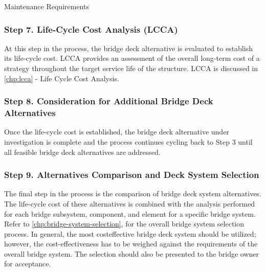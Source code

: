 \begin{table}
  \caption{Maintenance Requirements}
  \label{tab:maintenance-requirements}
\end{table}

\subsubsection*{Step 7. Life-Cycle Cost Analysis (LCCA)}
At this step in the process, the bridge deck alternative is evaluated to establish its life-cycle cost. LCCA provides an assessment of the overall long-term cost of a strategy throughout the target service life of the structure. LCCA is discussed in \cref{chp:lcca} - Life Cycle Cost Analysis.

\subsubsection*{Step 8. Consideration for Additional Bridge Deck Alternatives}
Once the life-cycle cost is established, the bridge deck alternative under investigation is complete and the process continues cycling back to Step 3 until all feasible bridge deck alternatives are addressed.

\subsubsection*{Step 9. Alternatives Comparison and Deck System Selection}
The final step in the process is the comparison of bridge deck system alternatives. The life-cycle cost of these alternatives is combined with the analysis performed for each bridge subsystem, component, and element for a specific bridge system. Refer to \cref{chp:bridge-system-selection}, for the overall bridge system selection process. In general, the most costeffective bridge deck system should be utilized; however, the cost-effectiveness has to be weighed against the requirements of the overall bridge system. The selection should also be presented to the bridge owner for acceptance.